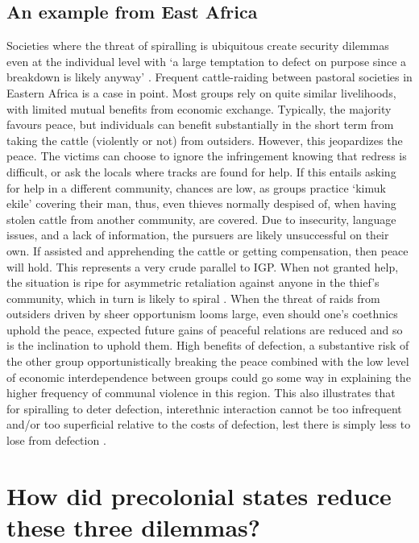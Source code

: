 \documentclass[12pt]{article}
\begin{document}
\subsection{An example from East Africa}

Societies where the threat of spiralling is ubiquitous create security dilemmas
even at the individual level with ‘a large temptation to defect on purpose since
a breakdown is likely anyway’ \citep[724]{Fearon_1996}. Frequent cattle-raiding
between pastoral societies in Eastern Africa is a case in point. Most groups
rely on quite similar livelihoods, with limited mutual benefits from economic
exchange. Typically, the majority favours peace, but individuals can benefit
substantially in the short term from taking the cattle (violently or not) from
outsiders. However, this jeopardizes the peace. The victims can choose to ignore
the infringement knowing that redress is difficult, or ask the locals where
tracks are found for help. If this entails asking for help in a different
community, chances are low, as groups practice ‘kimuk ekile’ covering their man,
thus, even thieves normally despised of, when having stolen cattle from another
community, are covered. Due to insecurity, language issues, and a lack of
information, the pursuers are likely unsuccessful on their own. If assisted and
apprehending the cattle or getting compensation, then peace will hold. This
represents a very crude parallel to IGP. When not granted help, the situation is
ripe for asymmetric retaliation against anyone in the thief’s community, which
in turn is likely to spiral \citep[104ff]{Eaton_2008}. When the threat of raids
from outsiders driven by sheer opportunism looms large, even should one’s
coethnics uphold the peace, expected future gains of peaceful relations are
reduced and so is the inclination to uphold them. High benefits of defection, a
substantive risk of the other group opportunistically breaking the peace
combined with the low level of economic interdependence between groups could go
some way in explaining the higher frequency of communal violence in this region.
This also illustrates that for spiralling to deter defection, interethnic
interaction cannot be too infrequent and/or too superficial relative to the
costs of defection, lest there is simply less to lose from defection
\citep{Fearon_1996}. 


\section{How did precolonial states reduce these three dilemmas?}
\end{document}
